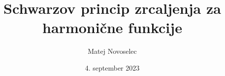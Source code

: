\documentclass{beamer}
\title{Schwarzov princip zrcaljenja za harmonične funkcije}
\author{Matej Novoselec}
\institute[UL FMF]{FMF Fakulteta za matematiko in fiziko}
\date{4. september 2023}
\theoremstyle{definition}
\theoremstyle{definition}
\begin{document}
\begin{frame}
   \titlepage
\end{frame}
\end{document}

